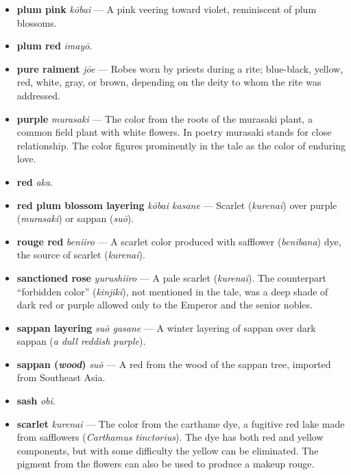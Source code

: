 \documentclass{article}
\begin{document}
\begin{multicols}{3}
\begin{footnotesize}
\begin{itemize}[
			label=,
			leftmargin=0em,
			rightmargin=-1.5em,
			itemindent=-2em,
			nosep,
		]
		\item \textbf{plum pink} \textit{kōbai} --- A pink veering toward violet, reminiscent of plum blossoms.

		\item \textbf{plum red} \textit{imayō}.

		\item \textbf{pure raiment} \textit{jōe} --- Robes worn by priests during a rite; blue-black, yellow, red, white, gray, or brown, depending on the deity to whom the rite was addressed.

		\item \textbf{purple} \textit{murasaki} --- The color from the roots of the murasaki plant, a common field plant with white flowers. In poetry murasaki stands for close relationship. The color figures prominently in the tale as the color of enduring love.

		\item \textbf{red} \textit{aka}.

		\item \textbf{red plum blossom layering} \textit{kōbai kasane} --- Scarlet (\textit{kurenai}) over purple (\textit{murasaki}) or sappan (\textit{suō}).

		\item \textbf{rouge red} \textit{beniiro} --- A scarlet color produced with safflower (\textit{benibana}) dye, the source of scarlet (\textit{kurenai}).

		\item \textbf{sanctioned rose} \textit{yurushiiro} --- A pale scarlet (\textit{kurenai}). The counterpart “forbidden color” (\textit{kinjiki}), not mentioned in the tale, was a deep shade of dark red or purple allowed only to the Emperor and the senior nobles.

		\item \textbf{sappan layering} \textit{suō gasane} --- A winter layering of sappan over dark sappan (\textit{a dull reddish purple}).

		\item \textbf{sappan (\textit{wood})} \textit{suō} --- A red from the wood of the sappan tree, imported from Southeast Asia.

		\item \textbf{sash} \textit{obi}.

		\item \textbf{scarlet} \textit{kurenai} --- The color from the carthame dye, a fugitive red lake made from safflowers (\textit{Carthamus tinctorius}). The dye has both red and yellow components, but with some difficulty the yellow can be eliminated. The pigment from the flowers can also be used to produce a makeup rouge.


\end{itemize}
\end{footnotesize}
\end{multicols}
\end{document}
